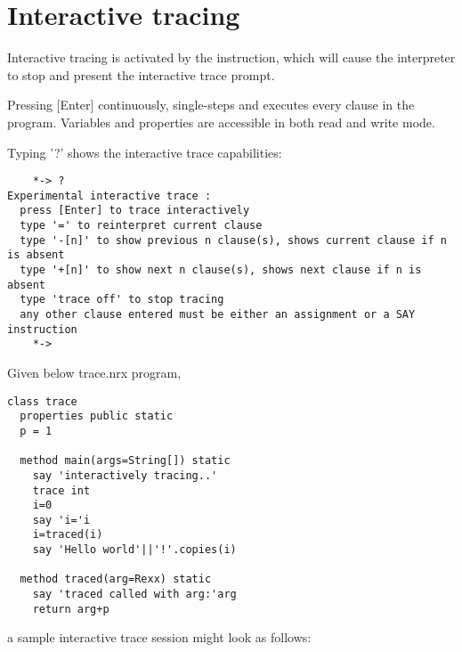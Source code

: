 \section{Interactive tracing}

Interactive tracing is activated by the  instruction, 
which will cause the interpreter to stop and present the interactive 
trace prompt. 

Pressing [Enter] continuously, single-steps and executes 
every clause in the program. Variables and properties are accessible in 
both read and write mode.

Typing '?' shows the interactive trace capabilities:
\begin{lstlisting}
    *-> ?
Experimental interactive trace :
  press [Enter] to trace interactively
  type '=' to reinterpret current clause
  type '-[n]' to show previous n clause(s), shows current clause if n is absent
  type '+[n]' to show next n clause(s), shows next clause if n is absent
  type 'trace off' to stop tracing
  any other clause entered must be either an assignment or a SAY instruction
    *-> 
\end{lstlisting}

Given below trace.nrx program, 
\begin{lstlisting}
class trace
  properties public static
  p = 1
 
  method main(args=String[]) static
    say 'interactively tracing..'
    trace int
    i=0
    say 'i='i 
    i=traced(i)
    say 'Hello world'||'!'.copies(i)

  method traced(arg=Rexx) static
    say 'traced called with arg:'arg  
    return arg+p
\end{lstlisting}

a sample interactive trace session might look as follows:


